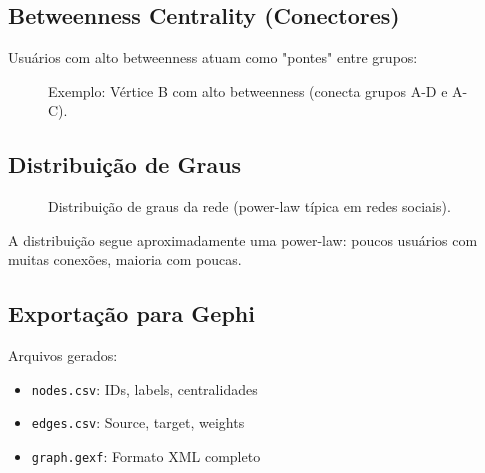 \documentclass[12pt,a4paper]{article}
\begin{document}
\subsection{Betweenness Centrality (Conectores)}

Usuários com alto betweenness atuam como "pontes" entre grupos:

\begin{figure}[h]
  \centering
  \caption{Exemplo: Vértice B com alto betweenness (conecta grupos A-D e A-C).}
  \label{fig:betweenness}
\end{figure}

\subsection{Distribuição de Graus}

\begin{figure}[h]
  \centering
  \caption{Distribuição de graus da rede (power-law típica em redes sociais).}
  \label{fig:degree_dist}
\end{figure}

A distribuição segue aproximadamente uma power-law: poucos usuários com muitas conexões, maioria com poucas.

\subsection{Exportação para Gephi}

Arquivos gerados:
\begin{itemize}
  \item \texttt{nodes.csv}: IDs, labels, centralidades
  \item \texttt{edges.csv}: Source, target, weights
  \item \texttt{graph.gexf}: Formato XML completo
\end{itemize}
\end{document}
